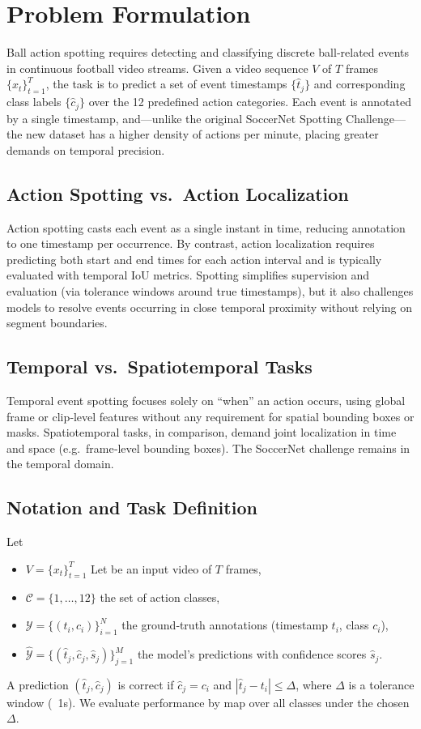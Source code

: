 \section{Problem Formulation}
\label{sec:problem_formulation}
Ball action spotting requires detecting and classifying discrete ball‐related events in continuous football video streams. Given a video sequence \(V\) of \(T\) frames \(\{x_t\}_{t=1}^T\), the task is to predict a set of event timestamps \(\{\hat t_j\}\) and corresponding class labels \(\{\hat c_j\}\) over the 12 predefined action categories. Each event is annotated by a single timestamp, and—unlike the original SoccerNet Spotting Challenge—the new dataset has a higher density of actions per minute, placing greater demands on temporal precision.

\subsection{Action Spotting vs.\ Action Localization}
Action spotting casts each event as a single instant in time, reducing annotation to one timestamp per occurrence. By contrast, action localization requires predicting both start and end times for each action interval and is typically evaluated with temporal IoU metrics. Spotting simplifies supervision and evaluation (via tolerance windows around true timestamps), but it also challenges models to resolve events occurring in close temporal proximity without relying on segment boundaries.

\subsection{Temporal vs.\ Spatiotemporal Tasks}
Temporal event spotting focuses solely on “when” an action occurs, using global frame or clip‐level features without any requirement for spatial bounding boxes or masks. Spatiotemporal tasks, in comparison, demand joint localization in time and space (e.g.\ frame‐level bounding boxes). The SoccerNet challenge remains in the temporal domain. 

\subsection{Notation and Task Definition}
Let
\begin{itemize}
    \item \(V = \{x_t\}_{t=1}^T\) Let be an input video of \(T\) frames,  
    \item \(\mathcal{C} = \{1,\dots,12\}\) the set of action classes,  
    \item \(\mathcal{Y} = \{(t_i,c_i)\}_{i=1}^N\) the ground‐truth annotations (timestamp \(t_i\), class \(c_i\)),  
    \item \(\hat{\mathcal{Y}} = \{(\hat t_j,\hat c_j,\hat s_j)\}_{j=1}^M\) the model’s predictions with confidence scores \(\hat s_j\).  
\end{itemize}
A prediction \((\hat t_j,\hat c_j)\) is correct if \(\hat c_j=c_i\) and \(|\hat t_j - t_i|\le\Delta\), where \(\Delta\) is a tolerance window (\ 1s). We evaluate performance by \acrfull{map} over all classes under the chosen \(\Delta\).  

